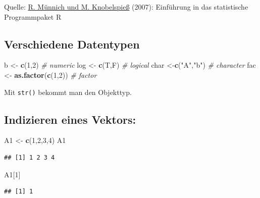 \documentclass[]{article}
\newenvironment{Shaded}{\begin{snugshade}}{\end{snugshade}}
\newcommand{\KeywordTok}[1]{\textcolor[rgb]{0.13,0.29,0.53}{\textbf{{#1}}}}
\newcommand{\DecValTok}[1]{\textcolor[rgb]{0.00,0.00,0.81}{{#1}}}
\newcommand{\StringTok}[1]{\textcolor[rgb]{0.31,0.60,0.02}{{#1}}}
\newcommand{\CommentTok}[1]{\textcolor[rgb]{0.56,0.35,0.01}{\textit{{#1}}}}
\newcommand{\NormalTok}[1]{{#1}}
\begin{document}
Quelle:
\href{https://www.uni-trier.de/fileadmin/fb4/prof/VWL/FIN/Oekonometrie/PC-UEbung/Einfuehrung_in_R.pdf}{R.
Münnich und M. Knobelspieß} (2007): Einführung in das statistische
Programmpaket R

\subsection{Verschiedene Datentypen}\label{verschiedene-datentypen-1}

\begin{Shaded}
\begin{Highlighting}[]
\NormalTok{b <-}\StringTok{ }\KeywordTok{c}\NormalTok{(}\DecValTok{1}\NormalTok{,}\DecValTok{2}\NormalTok{) }\CommentTok{# numeric}
\NormalTok{log <-}\StringTok{ }\KeywordTok{c}\NormalTok{(T,F) }\CommentTok{# logical}
\NormalTok{char <-}\KeywordTok{c}\NormalTok{(}\StringTok{"A"}\NormalTok{,}\StringTok{"b"}\NormalTok{) }\CommentTok{# character}
\NormalTok{fac <-}\StringTok{ }\KeywordTok{as.factor}\NormalTok{(}\KeywordTok{c}\NormalTok{(}\DecValTok{1}\NormalTok{,}\DecValTok{2}\NormalTok{)) }\CommentTok{# factor}
\end{Highlighting}
\end{Shaded}

Mit \texttt{str()} bekommt man den Objekttyp.

\subsection{Indizieren eines Vektors:}\label{indizieren-eines-vektors}

\begin{Shaded}
\begin{Highlighting}[]
\NormalTok{A1 <-}\StringTok{ }\KeywordTok{c}\NormalTok{(}\DecValTok{1}\NormalTok{,}\DecValTok{2}\NormalTok{,}\DecValTok{3}\NormalTok{,}\DecValTok{4}\NormalTok{)}
\NormalTok{A1}
\end{Highlighting}
\end{Shaded}

\begin{verbatim}
## [1] 1 2 3 4
\end{verbatim}

\begin{Shaded}
\begin{Highlighting}[]
\NormalTok{A1[}\DecValTok{1}\NormalTok{]}
\end{Highlighting}
\end{Shaded}

\begin{verbatim}
## [1] 1
\end{verbatim}
\end{document}
